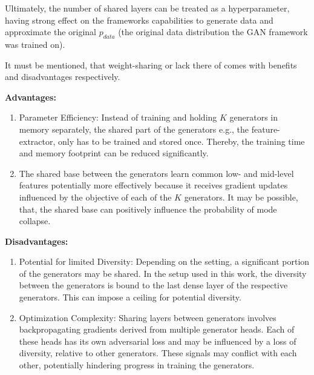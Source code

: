Ultimately, the number of shared layers can be treated as a hyperparameter, having strong effect on the frameworks capabilities to generate data and approximate the original \(p_{data}\) (the original data distribution the GAN framework was trained on).

It must be mentioned, that weight-sharing or lack there of comes with benefits and disadvantages respectively. 


\noindent\textbf{Advantages:}
\begin{enumerate}
    \item Parameter Efficiency: Instead of training and holding $K$ generators in memory separately, the shared part of the generators e.g., the feature-extractor, only has to be trained and stored once. Thereby, the training time and memory footprint can be reduced significantly. 
    \item The shared base between the generators learn common low- and mid-level features potentially more effectively because it receives gradient updates influenced by the objective of each of the $K$ generators. It may be possible, that, the shared base can positively influence the probability of mode collapse.
\end{enumerate}

\noindent\textbf{Disadvantages:}
\begin{enumerate}
    \item Potential for limited Diversity: Depending on the setting, a significant portion of the generators may be shared. In the setup used in this work, the diversity between the generators is bound to the last dense layer of the respective generators. This can impose a ceiling for potential diversity. 
    \item Optimization Complexity: Sharing layers between generators involves backpropagating gradients derived from multiple generator heads. Each of these heads has its own adversarial loss and may be influenced by a loss of diversity, relative to other generators. These signals may conflict with each other, potentially hindering progress in training the generators. 
\end{enumerate}




